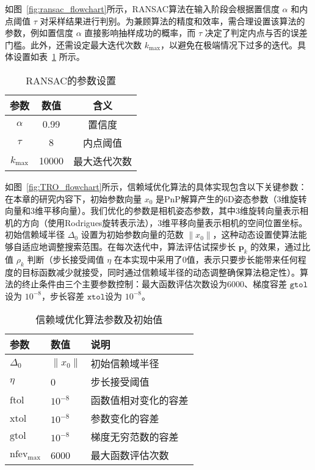 如图~\ref{fig:ransac_flowchart}所示，RANSAC算法在输入阶段会根据置信度 $\alpha$ 和内点阈值 $\tau$ 对采样结果进行判别。为兼顾算法的精度和效率，需合理设置该算法的参数，例如置信度 $\alpha$ 直接影响抽样成功的概率，而 $\tau$ 决定了判定内点与否的误差门槛。此外，还需设定最大迭代次数 $k_{\max}$，以避免在极端情况下过多的迭代。具体设置如表~\ref{tab:ransac_params_setting} 所示。


\begin{table}[h!]
	\centering
	\caption{RANSAC的参数设置}
	\label{tab:ransac_params_setting}
	\begin{tabular}{ccc}
		\toprule
		\textbf{参数} & \textbf{数值} & \textbf{含义} \\
		\midrule
		$\alpha$   & 0.99   & 置信度 \\
		$\tau$     & 8      & 内点阈值 \\
		$k_{\max}$ & 10000  & 最大迭代次数 \\
		\bottomrule
	\end{tabular}
\end{table}


如图~\ref{fig:TRO_flowchart}所示，信赖域优化算法的具体实现包含以下关键参数：在本章的研究内容下，初始参数向量 $x_0$ 是PnP解算产生的6D姿态参数（3维旋转向量和3维平移向量）。我们优化的参数是相机姿态参数，其中3维旋转向量表示相机的方向（使用Rodrigues旋转表示法），3维平移向量表示相机的空间位置坐标。初始信赖域半径 $\Delta_0$ 设置为初始参数向量的范数 $\|x_0\|$，这种动态设置使算法能够自适应地调整搜索范围。在每次迭代中，算法评估试探步长 $\mathbf{p}_k$ 的效果，通过比值 $\rho_k$ 判断（步长接受阈值 $\eta$ 在本实现中采用了0值，表示只要步长能带来任何程度的目标函数减少就接受，同时通过信赖域半径的动态调整确保算法稳定性）。算法的终止条件由三个主要参数控制：最大函数评估次数设为6000、梯度容差 $\texttt{gtol}$设为 $10^{-8}$，步长容差 $\texttt{xtol}$设为 $10^{-8}$。
\begin{table}[htbp]
	\centering
	\caption{信赖域优化算法参数及初始值}
	\label{tab:tr_parameters}
	\begin{tabular}{llp{8cm}}
		\hline
		参数 & 数值 & 说明 \\
		\hline
		$\Delta_0$ & $\|x_0\|$ & 初始信赖域半径\\
		$\eta$ & 0 & 步长接受阈值 \\
		$\text{ftol}$ & $10^{-8}$ & 函数值相对变化的容差 \\
		$\text{xtol}$ & $10^{-8}$ & 参数变化的容差 \\
		$\text{gtol}$ & $10^{-8}$ & 梯度无穷范数的容差 \\
		$\text{nfev}_\text{max}$ & 6000 & 最大函数评估次数 \\
		\hline
	\end{tabular}
\end{table}


